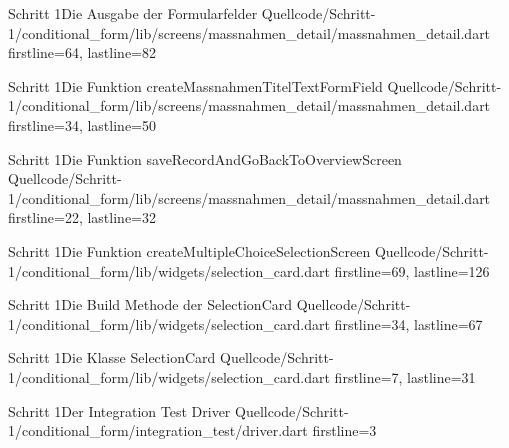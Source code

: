 \begin{alexlistingzwei}{Schritt 1}{Die Ausgabe der Formularfelder}
  {Quellcode/Schritt-1/conditional_form/lib/screens/massnahmen_detail/massnahmen_detail.dart}
  {firstline=64, lastline=82}
  \label{lst:Schritt1AusgabeDerFormularfelder}
\end{alexlistingzwei}

\begin{alexlistingzwei}{Schritt 1}{Die Funktion createMassnahmenTitelTextFormField}
  {Quellcode/Schritt-1/conditional_form/lib/screens/massnahmen_detail/massnahmen_detail.dart}
  {firstline=34, lastline=50}
  \label{lst:Schritt1DieFunktionCreateMassnahmenTitelTextFormField}
\end{alexlistingzwei}

\begin{alexlistingzwei}{Schritt 1}{Die Funktion saveRecordAndGoBackToOverviewScreen}
  {Quellcode/Schritt-1/conditional_form/lib/screens/massnahmen_detail/massnahmen_detail.dart}
  {firstline=22, lastline=32}
  \label{lst:Schritt1SaveRecordAndGoBackToOverviewScreen}
\end{alexlistingzwei}





\begin{alexlistingzwei}{Schritt 1}{Die Funktion createMultipleChoiceSelectionScreen}
  {Quellcode/Schritt-1/conditional_form/lib/widgets/selection_card.dart}
  {firstline=69, lastline=126}
  \label{lst:Schritt1FunktionCreateMultipleChoiceSelectionScreen}
\end{alexlistingzwei}

\begin{alexlistingzwei}{Schritt 1}{Die Build Methode der SelectionCard}
  {Quellcode/Schritt-1/conditional_form/lib/widgets/selection_card.dart}
  {firstline=34, lastline=67}
  \label{lst:Schritt1BuildMethodeDerSelectionCard}
\end{alexlistingzwei}

\begin{alexlistingzwei}{Schritt 1}{Die Klasse SelectionCard}
  {Quellcode/Schritt-1/conditional_form/lib/widgets/selection_card.dart}
  {firstline=7, lastline=31}
  \label{lst:Schritt1KlasseSelectionCard}
\end{alexlistingzwei}


\begin{alexlistingzwei}{Schritt 1}{Der Integration Test Driver}
  {Quellcode/Schritt-1/conditional_form/integration_test/driver.dart}
  {firstline=3}
  \label{lst:Schritt1IntegrationTestDriver}
\end{alexlistingzwei}


